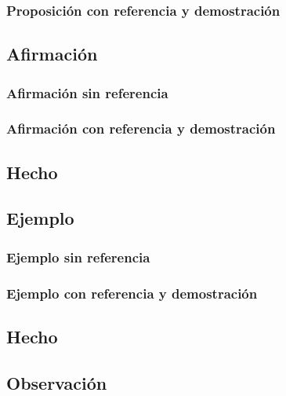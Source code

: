 \subsubsection{Proposición con referencia y demostración}
\propr{}{}{\lipsum[1]}
\begin{propp}
    \lipsum[1]
\end{propp}

\subsection{Afirmación}
\subsubsection{Afirmación sin referencia}
\af{}{\lipsum[1]}
\subsubsection{Afirmación con referencia y demostración}
\afr{}{}{\lipsum[1]}
\begin{afp}
    \lipsum[1]
\end{afp}

\subsection{Hecho}
\he{}{}{\lipsum[1]}
\newpage
\subsection{Ejemplo}
\subsubsection{Ejemplo sin referencia}
\ej{}{\lipsum[1]}
\subsubsection{Ejemplo con referencia y demostración}
\ejr{}{}{\lipsum[1]}
\begin{ejp}
    \lipsum[1]
\end{ejp}

\subsection{Hecho}
\he{}{}{\lipsum[1]}
\newpage

\subsection{Observación}
